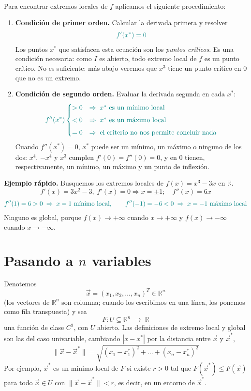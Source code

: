 \documentclass{article}
\newcommand{\R}{\ensuremath{\mathbb{R}}}
\newcommand{\vect}[1]{\vec{#1}}
\begin{document}
Para encontrar extremos locales de \(f\) aplicamos el siguiente procedimiento:

\begin{enumerate}
  \item \textbf{Condición de primer orden.}
    Calcular la derivada primera y resolver
    \[\color{teal}
      f'(x^*) = 0
    \]
    Los puntos \(x^*\) que satisfacen esta ecuación son los \emph{puntos críticos}. Es una condición necesaria: como \(I\) es abierto, todo extremo local de \(f\) es un punto crítico. No es suficiente: más abajo veremos que \(x^3\) tiene un punto crítico en \(0\) que no es un extremo.

  \item \textbf{Condición de segundo orden.}
    Evaluar la derivada segunda en cada \(x^*\):
    \[\color{teal}
      f''(x^*) \begin{cases}
        >0 & \Rightarrow\;x^*\text{ es un mínimo local}\\[4pt]
        <0 & \Rightarrow\;x^*\text{ es un máximo local}\\[4pt]
        =0 & \Rightarrow\;\text{el criterio no nos permite concluir nada}
      \end{cases}
    \]
    Cuando \(f''(x^*)=0\), \(x^*\) puede ser un mínimo, un máximo o ninguno de los dos: \(x^4\), \(-x^4\) y \(x^3\) cumplen \(f'(0)=f''(0)=0\), y en \(0\) tienen, respectivamente, un mínimo, un máximo y un punto de inflexión.
\end{enumerate}

\medskip

\noindent\textbf{Ejemplo rápido.} Busquemos los extremos locales de \(f(x)=x^3-3x\) en \(\R\).
\[
f'(x)=3x^2-3,\;f'(x)=0\Rightarrow x=\pm1;
\quad
f''(x)=6x
\]
\[\color{teal}
f''(1)=6>0\;\Rightarrow\;x=1\text{ mínimo local},\qquad
f''(-1)=-6<0\;\Rightarrow\;x=-1\text{ máximo local}
\]
Ninguno es global, porque \(f(x)\to+\infty\) cuando \(x\to+\infty\) y \(f(x)\to-\infty\) cuando \(x\to-\infty\).

\section*{Pasando a \(n\) variables}

Denotemos
\[
\vect{x} = (x_{1}, x_{2}, \dots, x_{n})^T \in \R^n
\]
(los vectores de \(\R^n\) son columna; cuando los escribimos en una línea, los ponemos como fila transpuesta) y sea
\[
F\colon U\subseteq\R^n\;\to\;\R
\]
una función de clase \(C^2\), con \(U\) abierto. Las definiciones de extremo local y global son las del caso univariable, cambiando \(|x-x^*|\) por la distancia entre \(\vect{x}\) y \(\vect{x}^*\),
\[
\|\vect{x}-\vect{x}^*\|=\sqrt{(x_1-x_1^*)^2+\dots+(x_n-x_n^*)^2}
\]
Por ejemplo, \(\vect{x}^*\) es un mínimo local de \(F\) si existe \(r>0\) tal que \(F(\vect{x}^*)\le F(\vect{x})\) para todo \(\vect{x}\in U\) con \(\|\vect{x}-\vect{x}^*\|<r\), es decir, en un entorno de \(\vect{x}^*\).
\end{document}
